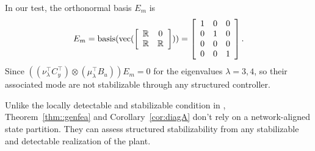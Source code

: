 In our test, the orthonormal basis \(E_m\) is
\begin{equation}
    E_m = \mathrm{basis} ({\mathrm{vec}}(\left[\begin{array}{cc}
        \mathbb{R} & 0 \\
        \mathbb{R} & \mathbb{R}
    \end{array}\right]))
    = \left[\begin{array}{ccc}
        1 & 0 & 0 \\
        0 & 1 & 0 \\
        0 & 0 & 0 \\
        0 & 0 & 1
    \end{array}\right].
\end{equation}
Since \(\left((\nu_\lambda^\top C_y^\top) \otimes(\mu_\lambda^\top B_u) \right)E_m = 0\) for the eigenvalues \(\lambda = 3,4\), so their associated mode are not stabilizable through any structured controller.
\begin{rem}
Unlike the locally detectable and stabilizable condition in \cite{Lessard2012strstab}, Theorem~\ref{thm::genfea} and Corollary~\ref{cor:diagA} don't rely on a network-aligned state partition. They can assess structured stabilizability from any stabilizable and detectable realization of the plant.
\end{rem}












